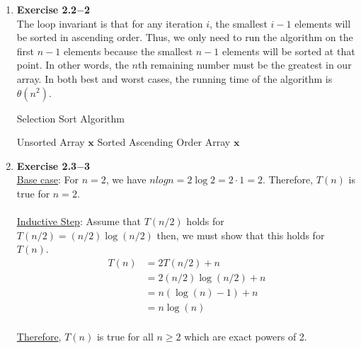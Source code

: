 \documentclass[a4paper,11pt,oneside]{book}
\begin{document}
\noindent{}
\normalsize

\begin{enumerate}
  \item {\textbf{Exercise 2.2$-$2}} 
  \\ The loop invariant is that for any iteration $i$, the smallest $i-1$ elements
  will be sorted in ascending order. Thus, we only need to run the algorithm on the first $n-1$
  elements because the smallest $n-1$ elements will be sorted at that point. In other words, the $n$th 
  remaining number must be the greatest in our array. In both best and worst cases, the running time of the
  algorithm is $\theta(n^2)$.
\begin{algorithm}
    \caption{Selection Sort Algorithm}
    \begin{algorithmic}[1]
        \Require Unsorted Array $\mathbf{x}$
        \Ensure Sorted Ascending Order Array $\mathbf{x}$
        \Statex
            \EndIf
          \EndFor
        \EndFor
        \EndFunction
    \end{algorithmic}
\end{algorithm}

  \item {\textbf{Exercise 2.3$-$3}}
  \\ \underline{Base case}: For $n = 2$, we have $nlogn = 2\log2 = 2 \cdot 1 = 2$. Therefore, $T(n)$ is true for $n = 2$.
  \\
  \\ \underline{Inductive Step}: Assume that $T(n/2)$ holds for $T(n/2) = (n/2)\log(n/2)$ then, we must show that this holds for $T(n)$.
  \\
  \begin{align*}
    T(n) &= 2T(n/2) + n\\
    &= 2(n/2)\log(n/2) + n\\
    &= n(\log(n)-1) + n\\
    &= n\log(n)
  \end{align*}
  \\ \underline{Therefore}, $T(n)$ is true for all $n \geq 2$ which are exact powers of 2.
  

\end{enumerate}
\end{document}
